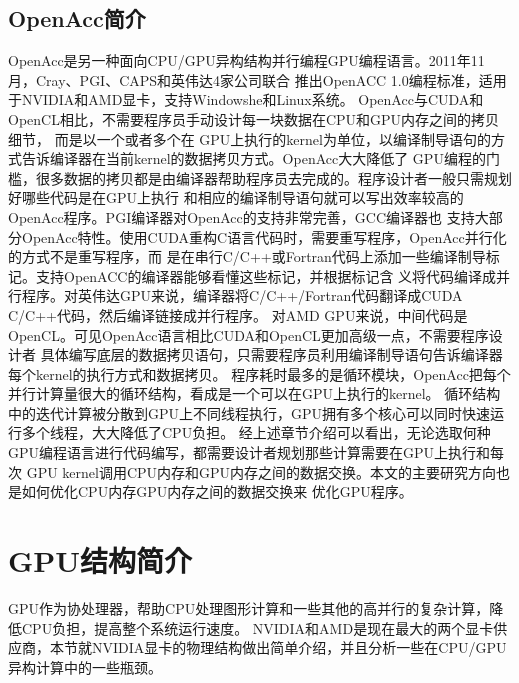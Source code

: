 \subsection{OpenAcc简介}
OpenAcc是另一种面向CPU/GPU异构结构并行编程GPU编程语言。2011年11月，Cray、PGI、CAPS和英伟达4家公司联合
推出OpenACC 1.0编程标准，适用于NVIDIA和AMD显卡，支持Windowshe和Linux系统。
OpenAcc与CUDA和OpenCL相比，不需要程序员手动设计每一块数据在CPU和GPU内存之间的拷贝细节，
而是以一个或者多个在
GPU上执行的kernel为单位，以编译制导语句的方式告诉编译器在当前kernel的数据拷贝方式。OpenAcc大大降低了
GPU编程的门槛，很多数据的拷贝都是由编译器帮助程序员去完成的。程序设计者一般只需规划好哪些代码是在GPU上执行
和相应的编译制导语句就可以写出效率较高的OpenAcc程序。PGI编译器对OpenAcc的支持非常完善，GCC编译器也
支持大部分OpenAcc特性。使用CUDA重构C语言代码时，需要重写程序，OpenAcc并行化的方式不是重写程序，而
是在串行C/C++或Fortran代码上添加一些编译制导标记。支持OpenACC的编译器能够看懂这些标记，并根据标记含
义将代码编译成并行程序。对英伟达GPU来说，编译器将C/C++/Fortran代码翻译成CUDA C/C++代码，然后编译链接成并行程序。
对AMD GPU来说，中间代码是OpenCL。可见OpenAcc语言相比CUDA和OpenCL更加高级一点，不需要程序设计者
具体编写底层的数据拷贝语句，只需要程序员利用编译制导语句告诉编译器每个kernel的执行方式和数据拷贝。
程序耗时最多的是循环模块，OpenAcc把每个并行计算量很大的循环结构，看成是一个可以在GPU上执行的kernel。
循环结构中的迭代计算被分散到GPU上不同线程执行，GPU拥有多个核心可以同时快速运行多个线程，大大降低了CPU负担。
经上述章节介绍可以看出，无论选取何种GPU编程语言进行代码编写，都需要设计者规划那些计算需要在GPU上执行和每次
GPU kernel调用CPU内存和GPU内存之间的数据交换。本文的主要研究方向也是如何优化CPU内存GPU内存之间的数据交换来
优化GPU程序。

\section{GPU结构简介}
GPU作为协处理器，帮助CPU处理图形计算和一些其他的高并行的复杂计算，降低CPU负担，提高整个系统运行速度。
NVIDIA和AMD是现在最大的两个显卡供应商，本节就NVIDIA显卡的物理结构做出简单介绍，并且分析一些在CPU/GPU
异构计算中的一些瓶颈。

